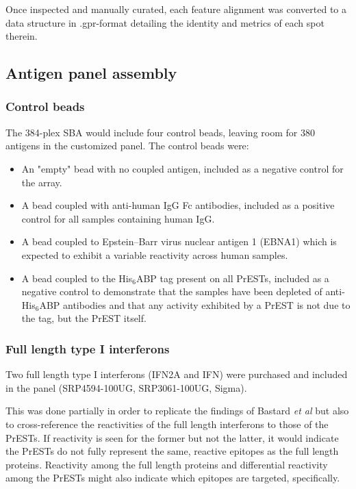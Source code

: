 \documentclass{article}
\begin{document}
Once inspected and manually curated, each feature alignment was converted to a data structure in .gpr-format detailing the identity and metrics of each spot therein.

\subsection{Antigen panel assembly}\label{method_panel}
\subsubsection{Control beads}\label{method_control_beads}
The 384-plex SBA would include four control beads, leaving room for 380 antigens in the customized panel. The control beads were:

\begin{itemize}
    \item An "empty" bead with no coupled antigen, included as a negative control for the array.
    \item A bead coupled with anti-human IgG Fc antibodies, included as a positive control for all samples containing human IgG.
    \item A bead coupled to Epstein–Barr virus nuclear antigen 1 (EBNA1) which is expected to exhibit a variable reactivity across human samples.
    \item A bead coupled to the His$_6$ABP tag present on all PrESTs, included as a negative control to demonstrate that the samples have been depleted of anti-His$_6$ABP antibodies and that any activity exhibited by a PrEST is not due to the tag, but the PrEST itself.
\end{itemize}

\subsubsection{Full length type I interferons}
Two full length type I interferons (IFN\textalpha 2A and IFN) were purchased and included in the panel (SRP4594-100UG, SRP3061-100UG, Sigma).

This was done partially in order to replicate the findings of Bastard \textit{et al} \cite{bastard} but also to cross-reference the reactivities of the full length interferons to those of the PrESTs. If reactivity is seen for the former but not the latter, it would indicate the PrESTs do not fully represent the same, reactive epitopes as the full length proteins. Reactivity among the full length proteins and differential reactivity among the PrESTs might also indicate which epitopes are targeted, specifically.
\end{document}
